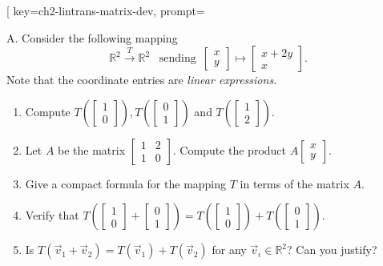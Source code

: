 \begin{SaveQuestion}[
        key=ch2-lintrans-matrix-dev,
        prompt={A.   Consider the following mapping $$\mathbb{R}^2 \overset{T}\longrightarrow \mathbb{R}^2 \,\,\,\,\,{\text{sending}} \,\,\, \begin{bmatrix}x\\y\end{bmatrix} \mapsto \begin{bmatrix}x + 2y \\ x\end{bmatrix}.$$ Note that the coordinate entries are {\it linear expressions.} \begin{enumerate}
	\item Compute $T(\begin{bmatrix}1\\0\end{bmatrix}) $,\,$T(\begin{bmatrix}0\\1\end{bmatrix} ) $ and $T( \begin{bmatrix}1\\2\end{bmatrix})$. \item Let $A$ be the matrix $ \begin{bmatrix}1 & 2 \\1 &0\end{bmatrix}. $ Compute the product $A \begin{bmatrix}x\\y\end{bmatrix}$. \item Give a compact formula for the mapping $T$ in terms of the matrix $A$. \item Verify that $T( \begin{bmatrix}1\\0\end{bmatrix} + \begin{bmatrix}0\\1\end{bmatrix}) = T( \begin{bmatrix}1\\0\end{bmatrix})+ T(\begin{bmatrix}0\\1\end{bmatrix})$. \item Is  $T(\vec v_1 + \vec v_2) = T(\vec v_1) + T(\vec v_2)$ for any $\vec v_i \in \mathbb{R}^2$? Can you justify? \\

\end{enumerate}}
\end{SaveQuestion}
